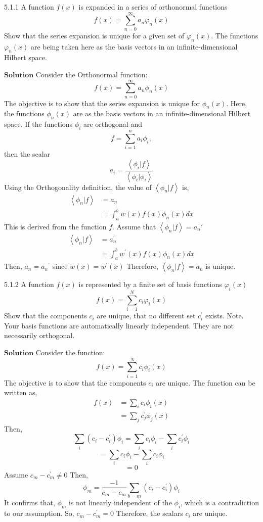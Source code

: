 


\begin{mybox}{5.1.1}
A function $f(x)$ is expanded in a series of orthonormal functions
$$
f(x)=\sum_{n=0}^{\infty} a_{n} \varphi_{n}(x)
$$
Show that the series expansion is unique for a given set of $\varphi_{n}(x) .$ The functions $\varphi_{n}(x)$ are being taken here as the basis vectors in an infinite-dimensional Hilbert space.
\end{mybox}

$\boxed{\textbf{Solution}}$ Consider the Orthonormal function:
$$
f(x)=\sum_{n=0}^{\infty} a_{n} \phi_{n}(x)
$$
The objective is to show that the series expansion is unique for $\phi_{n}(x)$.
Here, the functions $\phi_{n}(x)$ are as the basis vectors in an infinite-dimensional Hilbert space.
If the functions $\phi_{i}$ are orthogonal and $$f=\sum_{i=1}^{n} a_{i} \phi_{i},$$ then the scalar $$a_{i}=\frac{\left\langle\phi_{i} | f\right\rangle}{\left\langle\phi_{i} | \phi_{i}\right\rangle}$$
Using the Orthogonality definition, the value of $\left\langle\phi_{n} | f\right\rangle$ is,
$$
\begin{aligned}
\left\langle\phi_{n} | f\right\rangle &=a_{n} \\
&=\int_{a}^{b} w(x) f(x) \phi_{n}(x) d x
\end{aligned}
$$
This is derived from the function $f$.
Assume that $\left\langle\phi_{n} | f\right\rangle=a_{n}'$
$$
\begin{aligned}
\left\langle\phi_{n} | f\right\rangle &=a_{n}^{\prime} \\
&=\int_{a}^{b} w^{\prime}(x) f(x) \phi_{n}(x) d x
\end{aligned}
$$
Then, $a_{n}=a_{n}{ }^{\prime}$ since $w(x)=w^{\prime}(x)$ Therefore, $\left\langle\phi_{n} | f\right\rangle=a_{n}$ is unique.


\newpage

\begin{mybox}{5.1.2}
A function $f(x)$ is represented by a finite set of basis functions $\varphi_{i}(x)$
$$
f(x)=\sum_{i=1}^{N} c_{i} \varphi_{i}(x)
$$
Show that the components $c_{i}$ are unique, that no different set $c_{i}^{\prime}$ exists.
Note. Your basis functions are automatically linearly independent. They are not necessarily orthogonal.
\end{mybox}
$\boxed{\textbf{Solution}}$ Consider the function:
$$f(x)=\sum_{i=1}^{N} c_{i} \phi_{i}(x)$$
The objective is to show that the components $c_{i}$ are unique.
The function can be written as,
$$
\begin{aligned}
f(x) &=\sum_{i} c_{i} \phi_{i}(x) \\
&=\sum_{j} c_{j}^{\prime} \phi_{j}(x)
\end{aligned}
$$
Then,
$$\sum_{i}\left(c_{i}-c_{i}^{\prime}\right) \phi_{i}=\sum_{i} c_{i} \phi_{i}-\sum_{i} c_{i}^{\prime} \phi_{i}$$
$$=\sum_{i} c_{i} \phi_{i}-\sum_{i} c_{i} \phi_{i}$$
$$=0$$
Assume $c_{m}-c_{m}^{\prime} \neq 0$ Then,
$$
\phi_{m}=\frac{-1}{c_{m}-c_{m}} \sum_{b=m}\left(c_{i}-c_{i}^{\prime}\right) \phi_{i}
$$
It confirms that, $\phi_{m}$ is not linearly independent of the $\phi_{i}$, which is a contradiction to our assumption. So, $c_{m}-c_{m}^{\prime}=0$ Therefore, the scalars $c_{i}$ are unique.

